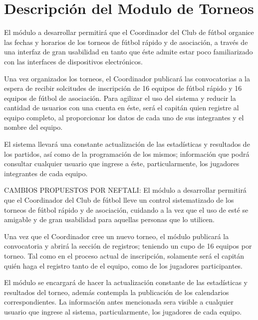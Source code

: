 \section{Descripción del Modulo de Torneos}

\begin{description}

\item El módulo a desarrollar permitirá que el Coordinador del Club de fútbol organice las fechas y horarios de los torneos de fútbol rápido y de asociación, a través de una interfaz de gran usabilidad en tanto que éste admite estar poco familiarizado con las interfaces de dispositivos electrónicos.

Una vez organizados los torneos, el Coordinador publicará las convocatorias a la espera de recibir solcitudes de inscripción de 16 equipos de fútbol rápido y 16 equipos de fútbol de asociación. Para agilizar el uso del sistema y reducir la cantidad de usuarios con una cuenta en éste, será el capitán quien registre al equipo completo, al proporcionar los datos de cada uno de sus integrantes y el nombre del equipo.

El sistema llevará una constante actualización de las estadísticas y resultados de los partidos, así como de la programación de los mismos; información que podrá consultar cualquier usuario que ingrese a éste, particularmente, los jugadores integrantes de cada equipo.

CAMBIOS PROPUESTOS POR NEFTALI:
El módulo a desarrollar permitirá que el Coordinador del Club de fútbol lleve un control sistematizado de los torneos de fútbol rápido y de asociación, cuidando a la vez que el uso de esté se amigable y de gran usabilidad para aquellas personas que lo utilicen.

Una vez que el Coordinador cree un nuevo torneo, el módulo publicará la convocatoria y abrirá la sección de registros; teniendo un cupo de 16 equipos por torneo. Tal como en el proceso actual de inscripción, solamente será el capitán quién haga el registro tanto de el equipo, como de los jugadores participantes. 

El módulo se encargará de hacer la actualización constante de las estadísticas y resultados del torneo, además contempla la publicación de los calendarios correspondientes. La información antes mencionada sera visible a cualquier usuario que ingrese al sistema, particularmente, los jugadores de cada equipo. 

\end{description}

